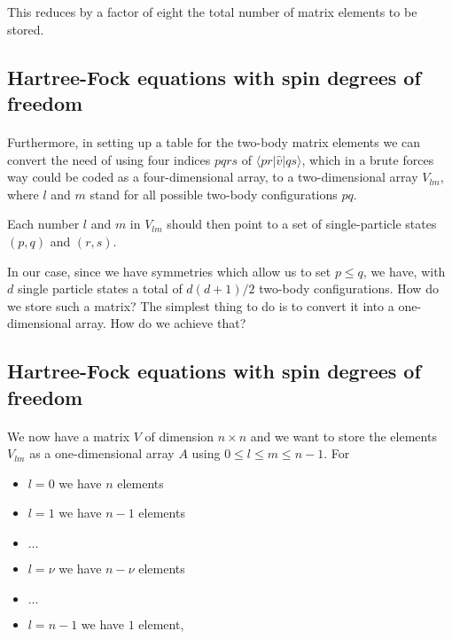 \documentclass[%
twoside,                 %
final,                   %
10pt]{article}
\begin{document}
\noindent
This reduces by a factor of eight the total number of matrix elements to be stored.



\subsection{Hartree-Fock equations with spin degrees of freedom}

\paragraph{}

Furthermore, in setting up a table for the two-body matrix elements we can convert the need of using four indices $pqrs$ of 
$\langle pr | \hat{v}|qs\rangle$, which in a brute forces way could be coded as a four-dimensional array, to 
a two-dimensional array $V_{lm}$, where $l$ and $m$ stand for all possible two-body configurations $pq$.

Each number $l$ and $m$ in $V_{lm}$  should then point to a set of single-particle  states $(p,q)$ and $(r,s)$.  

In our case, since we have 
symmetries which allow us to set $p\le q$, we have, with $d$ single particle states a total of $d(d+1)/2$ two-body configurations.
How do we store such a matrix? The simplest thing to do is to convert it into a one-dimensional array. How do we achieve that?



\subsection{Hartree-Fock equations with spin degrees of freedom}

\paragraph{}

We now have a matrix $V$ of dimension $n\times n$ and we want to store the elements $V_{lm}$ as a one-dimensional array $A$ using
$0 \le l \le m \le n-1$. For

\begin{itemize}
  \item $l=0$ we have $n$ elements

  \item $l=1$ we have $n-1$ elements

  \item $\dots$

  \item $l=\nu$ we have $n-\nu$ elements

  \item $\dots$

  \item $l=n-1$ we have $1$ element,
\end{itemize}
\end{document}
